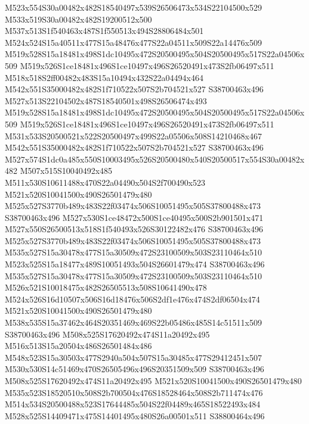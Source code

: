 \documentclass{article}
\begin{document}
\begin{multicols}{2}
M523x554S30a00482x482S18540497x539S26506473x534S22104500x529 M533x519S30a00482x482S19200512x500 M537x513S1f540463x487S1f550513x494S28806484x501 M524x524S15a40511x477S15a48476x477S22a04511x509S22a14476x509 M519x528S15a18481x498S1dc10495x472S20500495x504S20500495x517S22a04506x509 M519x526S1ce18481x496S1ce10497x496S26520491x473S2fb06497x511 M518x518S2ff00482x483S15a10494x432S22a04494x464 M542x551S35000482x482S1f710522x507S2b704521x527 S38700463x496 M527x513S22104502x487S18540501x498S26506474x493 M519x528S15a18481x498S1dc10495x472S20500495x504S20500495x517S22a04506x509 M519x526S1ce18481x496S1ce10497x496S26520491x473S2fb06497x511 M531x533S20500521x522S20500497x499S22a05506x508S14210468x467 M542x551S35000482x482S1f710522x507S2b704521x527 S38700463x496 M527x574S1dc0a485x550S10003495x526S20500480x540S20500517x554S30a00482x482 M507x515S10040492x485 M511x530S10611488x470S22a04490x504S2f700490x523 M521x520S10041500x490S26501479x480 M525x527S3770b489x483S22f03474x506S10051495x505S37800488x473 S38700463x496 M527x530S1ce48472x500S1ce40495x500S2b901501x471 M527x550S26500513x518S1f540493x526S30122482x476 S38700463x496 M525x527S3770b489x483S22f03474x506S10051495x505S37800488x473 M535x527S15a30478x477S15a30509x472S23100509x503S23110464x510 M523x525S15a18477x489S10051493x504S26601479x474 S38700463x496 M535x527S15a30478x477S15a30509x472S23100509x503S23110464x510 M526x521S10018475x482S26505513x508S10641490x478 M524x526S16d10507x506S16d18476x506S2df1e476x474S2df06504x474 M521x520S10041500x490S26501479x480 M538x535S15a37462x464S20351469x469S22b05486x485S14c51511x509 S38700463x496 M508x525S17620492x474S11a20492x495 M516x513S15a20504x486S26501484x486 M548x523S15a30503x477S2940a504x507S15a30485x477S29412451x507 M530x530S14c51469x470S26505496x496S20351509x509 S38700463x496 M508x525S17620492x474S11a20492x495 M521x520S10041500x490S26501479x480 M535x523S18520510x508S2b700504x476S18528464x508S2b711474x476 M514x534S20500488x523S17644485x504S22f04489x465S18522493x484 M528x525S14409471x475S14401495x480S26a00501x511 S38800464x496




\end{multicols}
\end{document}
